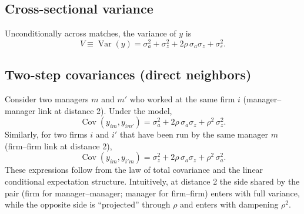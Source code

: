 \documentclass[11pt]{article}
\begin{document}
\subsection{Cross-sectional variance}
Unconditionally across matches, the variance of $y$ is
\begin{equation}
\label{eq:var}
 V \equiv \operatorname{Var}(y) = \sigma_a^2 + \sigma_z^2 + 2\rho\,\sigma_a\sigma_z + \sigma_\varepsilon^2.
\end{equation}

\subsection{Two-step covariances (direct neighbors)}
Consider two managers $m$ and $m'$ who worked at the same firm $i$ (manager--manager link at distance 2). Under the model,
\begin{equation}
\label{eq:mm2}
 \operatorname{Cov}(y_{im}, y_{im'}) = \sigma_a^2 + 2\rho\,\sigma_a\sigma_z + \rho^2\,\sigma_z^2.
\end{equation}
Similarly, for two firms $i$ and $i'$ that have been run by the same manager $m$ (firm--firm link at distance 2),
\begin{equation}
\label{eq:ff2}
 \operatorname{Cov}(y_{im}, y_{i'm}) = \sigma_z^2 + 2\rho\,\sigma_a\sigma_z + \rho^2\,\sigma_a^2.
\end{equation}
These expressions follow from the law of total covariance and the linear conditional expectation structure. Intuitively, at distance 2 the side shared by the pair (firm for manager--manager; manager for firm--firm) enters with full variance, while the opposite side is ``projected'' through $\rho$ and enters with dampening $\rho^2$.
\end{document}
